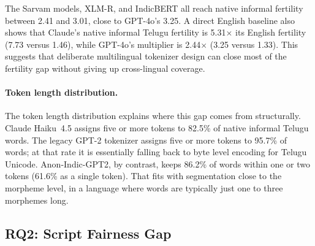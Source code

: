 ﻿\documentclass[11pt]{article}
\begin{document}
The Sarvam models, XLM-R, and IndicBERT all reach native informal
fertility between 2.41 and 3.01, close to GPT-4o's 3.25. A direct
English baseline also shows that Claude's native informal Telugu
fertility is 5.31$\times$ its English fertility (7.73 versus 1.46),
while GPT-4o's multiplier is 2.44$\times$ (3.25 versus 1.33). This
suggests that deliberate multilingual tokenizer design can close
most of the fertility gap without giving up cross-lingual coverage.

\paragraph{Token length distribution.}
The token length distribution explains where this gap comes from
structurally. Claude Haiku~4.5 assigns five or more tokens to 82.5\%
of native informal Telugu words. The legacy GPT-2 tokenizer assigns
five or more tokens to 95.7\% of words; at that rate it is
essentially falling back to byte level encoding for Telugu Unicode.
Anon-Indic-GPT2, by contrast, keeps 86.2\% of words within one
or two tokens (61.6\% as a single token). That fits with segmentation close to the morpheme
level, in a language where words are typically just one to three
morphemes long.


\subsection{RQ2: Script Fairness Gap}
\label{sec:results-gap}
\end{document}
